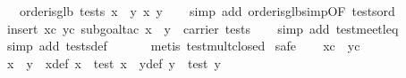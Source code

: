 \begin{isabellebody}
\ \ \ {}order{}is{}glb\ tests\ {}x\ {}\ y{}\ {}x{}\ y{}{}\isanewline
%
\isadelimproof
\ \ %
\endisadelimproof
%
\isatagproof
{}\isamarkupfalse%
\ {}simp\ add{}\ order{}is{}glb{}simp{}OF\ tests{}ord{}{}\isanewline
\ \ \isamarkupfalse%
\ {}insert\ xc\ yc{}\ subgoal{}tac\ {}x\ {}\ y\ {}\ carrier\ tests{}{}\isanewline
\ \ \isamarkupfalse%
\ {}simp\ add{}\ test{}meet{}leq{}\isanewline
\ \ \isamarkupfalse%
\ {}simp\ add{}\ tests{}def{}\isanewline
\ \ \isamarkupfalse%
\isanewline
\ \ \isamarkupfalse%
\ {}metis\ test{}mult{}closed{}\isanewline
{}\isamarkupfalse%
\ safe\isanewline
\ \ \isamarkupfalse%
\ xc\ \ yc\ \isamarkupfalse%
\ x{}\ \ y{}\ \ x{}{}def{}\ {}x\ {}\ test\ x{}{}\ \ y{}{}def{}\ {}y\ {}\ test\ y{}{}\isanewline

\end{isabellebody}
